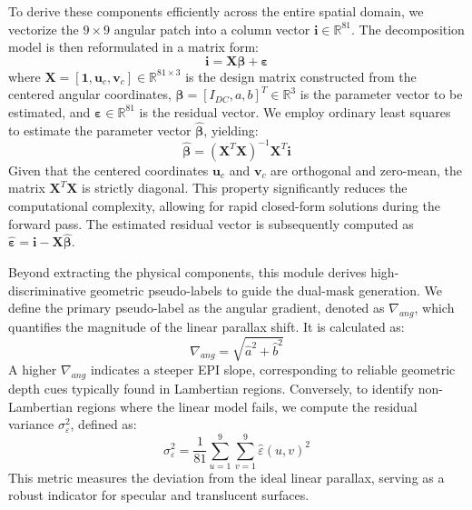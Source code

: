 \documentclass[lettersize,journal]{IEEEtran}
\begin{document}
To derive these components efficiently across the entire spatial domain, we vectorize the $9 \times 9$ angular patch into a column vector $\mathbf{i} \in \mathbb{R}^{81}$. The decomposition model is then reformulated in a matrix form:
\begin{equation}
\mathbf{i} = \mathbf{X} \boldsymbol{\beta} + \boldsymbol{\varepsilon}
\label{eq:ch3_4}
\end{equation}
where $\mathbf{X} = [\mathbf{1}, \mathbf{u}_c, \mathbf{v}_c] \in \mathbb{R}^{81 \times 3}$ is the design matrix constructed from the centered angular coordinates, $\boldsymbol{\beta} = [I_{DC}, a, b]^T \in \mathbb{R}^{3}$ is the parameter vector to be estimated, and $\boldsymbol{\varepsilon} \in \mathbb{R}^{81}$ is the residual vector. We employ ordinary least squares to estimate the parameter vector $\hat{\boldsymbol{\beta}}$, yielding:
\begin{equation}
\hat{\boldsymbol{\beta}} = (\mathbf{X}^T \mathbf{X})^{-1} \mathbf{X}^T \mathbf{i}
\label{eq:ch3_5}
\end{equation}
Given that the centered coordinates $\mathbf{u}_c$ and $\mathbf{v}_c$ are orthogonal and zero-mean, the matrix $\mathbf{X}^T \mathbf{X}$ is strictly diagonal. This property significantly reduces the computational complexity, allowing for rapid closed-form solutions during the forward pass. The estimated residual vector is subsequently computed as $\hat{\boldsymbol{\varepsilon}} = \mathbf{i} - \mathbf{X} \hat{\boldsymbol{\beta}}$.

Beyond extracting the physical components, this module derives high-discriminative geometric pseudo-labels to guide the dual-mask generation. We define the primary pseudo-label as the angular gradient, denoted as $\nabla_{ang}$, which quantifies the magnitude of the linear parallax shift. It is calculated as:
\begin{equation}
\nabla_{ang} = \sqrt{\hat{a}^2 + \hat{b}^2}
\label{eq:ch3_6}
\end{equation}
A higher $\nabla_{ang}$ indicates a steeper EPI slope, corresponding to reliable geometric depth cues typically found in Lambertian regions. Conversely, to identify non-Lambertian regions where the linear model fails, we compute the residual variance $\sigma_{\varepsilon}^2$, defined as:
\begin{equation}
\sigma_{\varepsilon}^2 = \frac{1}{81} \sum_{u=1}^{9} \sum_{v=1}^{9} \hat{\varepsilon}(u,v)^2
\label{eq:ch3_7}
\end{equation}
This metric measures the deviation from the ideal linear parallax, serving as a robust indicator for specular and translucent surfaces.
\end{document}
